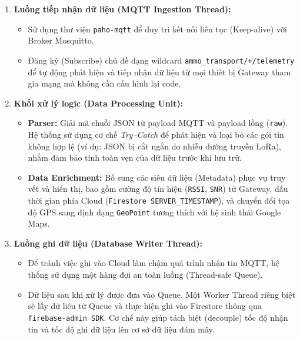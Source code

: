 \begin{enumerate}
    \item \textbf{Luồng tiếp nhận dữ liệu (MQTT Ingestion Thread):}
    \begin{itemize}
        \item Sử dụng thư viện \texttt{paho-mqtt} để duy trì kết nối liên tục (Keep-alive) với Broker Mosquitto.
        \item Đăng ký (Subscribe) chủ đề dạng wildcard \texttt{ammo\_transport/+/telemetry} để tự động phát hiện và tiếp nhận dữ liệu từ mọi thiết bị Gateway tham gia mạng mà không cần cấu hình lại code.
    \end{itemize}

\item \textbf{Khối xử lý logic (Data Processing Unit):}
\begin{itemize}
    \item \textbf{Parser:} Giải mã chuỗi JSON từ payload MQTT và payload lồng (\texttt{raw}). 
    Hệ thống sử dụng cơ chế \textit{Try--Catch} để phát hiện và loại bỏ các gói tin không hợp lệ  (ví dụ: JSON bị cắt ngắn do nhiễu đường truyền LoRa), nhằm đảm bảo tính toàn vẹn của dữ liệu trước khi lưu trữ.
    
    \item \textbf{Data Enrichment:} Bổ sung các siêu dữ liệu (Metadata) phục vụ truy vết và hiển thị,  bao gồm cường độ tín hiệu (\texttt{RSSI}, \texttt{SNR}) từ Gateway, dấu thời gian phía Cloud (\texttt{Firestore SERVER\_TIMESTAMP}), và chuyển đổi tọa độ GPS sang định dạng \texttt{GeoPoint} tương thích với hệ sinh thái Google Maps.
\end{itemize}

    \item \textbf{Luồng ghi dữ liệu (Database Writer Thread):}
    \begin{itemize}
        \item Để tránh việc ghi vào Cloud làm chậm quá trình nhận tin MQTT, hệ thống sử dụng một hàng đợi an toàn luồng (Thread-safe Queue).
        \item Dữ liệu sau khi xử lý được đưa vào Queue. Một Worker Thread riêng biệt sẽ lấy dữ liệu từ Queue và thực hiện ghi vào Firestore thông qua \texttt{firebase-admin SDK}. Cơ chế này giúp tách biệt (decouple) tốc độ nhận tin và tốc độ ghi dữ liệu lên cơ sở dữ liệu đám mây.
    \end{itemize}
\end{enumerate}

